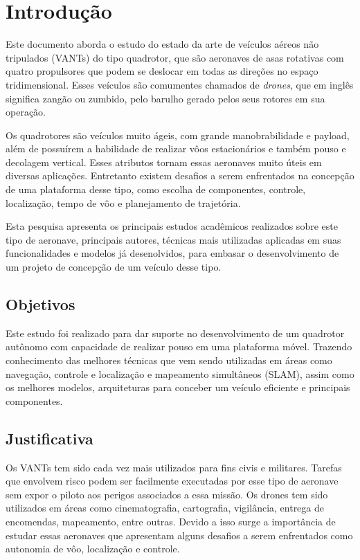 
\chapter{Introdução}
\label{chap:intro}

Este documento aborda o estudo do estado da arte de veículos aéreos não tripulados (VANTs) do tipo quadrotor, que são aeronaves de asas rotativas com quatro propulsores que podem se deslocar em todas as direções no espaço tridimensional. Esses veículos são comumentes chamados de \textit{drones}, que em inglês significa zangão ou zumbido, pelo barulho gerado pelos seus rotores em sua operação.

Os quadrotores são veículos muito ágeis, com grande manobrabilidade e payload, além de possuírem a habilidade de realizar vôos estacionários e também pouso e decolagem vertical. Esses atributos tornam essas aeronaves muito úteis em diversas aplicações. Entretanto existem desafios a serem enfrentados na concepção de uma plataforma desse tipo, como  escolha de componentes, controle, localização, tempo de vôo e planejamento de trajetória.

Esta pesquisa apresenta os principais estudos acadêmicos realizados sobre este tipo de aeronave, principais autores, técnicas mais utilizadas aplicadas em suas funcionalidades e modelos já desenolvidos, para embasar o desenvolvimento de um projeto de concepção de um veículo desse tipo.

\section{Objetivos}
\label{sec:obj}

Este estudo foi realizado para dar suporte no desenvolvimento de um quadrotor autônomo com capacidade de realizar pouso em uma plataforma móvel. Trazendo conhecimento das melhores técnicas que vem sendo utilizadas em áreas como navegação, controle e localização e mapeamento simultâneos (SLAM), assim como os melhores modelos, arquiteturas para conceber um veículo eficiente e principais componentes.

\section{Justificativa}
\label{sec:justi}

Os VANTs tem sido cada vez mais utilizados para fins civis e militares. Tarefas que envolvem risco podem ser facilmente executadas por esse tipo de aeronave sem expor o piloto aos perigos associados a essa missão. Os drones tem sido utilizados em áreas como cinematografia, cartografia, vigilância, entrega de encomendas, mapeamento, entre outras. Devido a isso surge a importância de estudar essas aeronaves que apresentam alguns desafios a serem enfrentados como autonomia de vôo, localização e controle.

